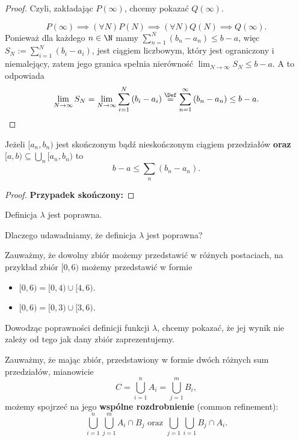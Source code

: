 \begin{proof}
        Czyli, zakładając $P\left( \infty \right) $, chcemy pokazać $Q\left( \infty \right) $.

	\[
	P\left( \infty \right) \implies \left(\forall N \right) P\left( N \right)\implies \left(\forall N \right)Q\left( N \right)\implies Q\left( \infty \right)  
	.\] 
	Ponieważ dla każdego $n \in \N$ mamy $\sum_{n=1}^{N} \left( b_{n}-a_{n} \right) \le b-a$, więc $S_{N} := \sum_{i=1}^{N} \left( b_{i}-a_{i} \right) $, jest ciągiem liczbowym, który jest ograniczony i niemalejący, zatem jego granica spełnia nierówność  $\lim_{N \to \infty} S_{N}\le b-a$. A to odpowiada 
	\[
	\lim_{N \to \infty} S_{N} = \lim_{N \to \infty} \sum_{i=1}^{N} \left( b_{i}-a_{i} \right) \overset{\Def}{=} \sum_{n = 1}^{\infty} \left( b_{n}-a_{n} \right)\le  b-a
	.\]

\end{proof} 
\begin{lemma}
	Jeżeli $[a_{n},b_{n}) $ jest skończonym bądź nieskończonym ciągiem przedziałów \textbf{oraz} $[a,b) \subseteq \bigcup_{n}[a_{n},b_{n})$ to
	\[
		b-a\le \sum_{n} (b_{n}-a_{n})
	.\] 
\end{lemma} 
\begin{proof}
\noindent \textbf{Przypadek skończony:} 
\end{proof} 
\begin{lemma}
	Definicja $\lambda$ jest poprawna.
\end{lemma} 
\begin{remark}
	Dlaczego udawadniamy, że definicja $\lambda$ jest poprawna?  

\noindent Zauważmy, że dowolny zbiór możemy przedstawić w różnych postaciach, na przykład zbiór $[0,6)$ możemy przedstawić w formie 
\begin{itemize}
    \item $[0,6) = [0,4) \cup [4,6)$.
		\item $[0,6) = [0,3) \cup [3,6)$. 
\end{itemize}

Dowodząc poprawności definicji funkcji $\lambda$, chcemy pokazać, że jej wynik nie zależy od tego jak dany zbiór zaprezentujemy. 
\end{remark} 

Zauważmy, że mając zbiór, przedstawiony w formie dwóch różnych sum przedziałów, mianowicie
\[
    C = \bigcup_{i = 1}^{n} A_{i} = \bigcup_{j = 1}^{m} B_{i}       
,\]
możemy spojrzeć na jego \textbf{wspólne rozdrobnienie} (common refinement):
\[
    \bigcup_{i = 1}^{n}\bigcup_{j = 1}^{m} A_{i}\cap B_{j} \text{ oraz } \bigcup_{j = 1} \bigcup_{i = 1} B_{j} \cap A_{i}            
.\]

